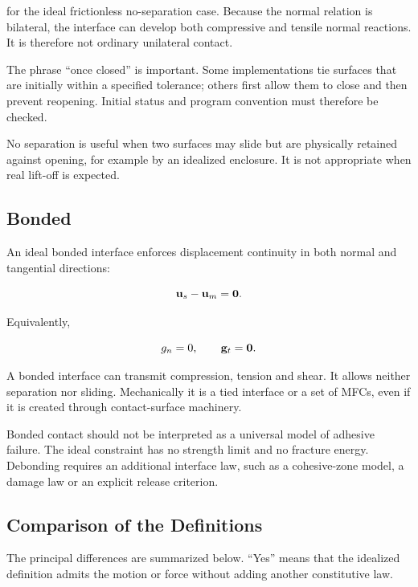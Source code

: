 for the ideal frictionless no-separation case. Because the normal relation is
bilateral, the interface can develop both compressive and tensile normal
reactions. It is therefore not ordinary unilateral contact.

The phrase ``once closed'' is important. Some implementations tie surfaces that
are initially within a specified tolerance; others first allow them to close
and then prevent reopening. Initial status and program convention must therefore
be checked.

No separation is useful when two surfaces may slide but are physically retained
against opening, for example by an idealized enclosure. It is not appropriate
when real lift-off is expected.

\subsection{Bonded}

An ideal bonded interface enforces displacement continuity in both normal and
tangential directions:

\begin{bbox}
    \begin{equation}\label{contact-bonded-definition}
        \mathbf{u}_s - \mathbf{u}_m = \mathbf{0}.
    \end{equation}
\end{bbox}

Equivalently,

\begin{equation}
    g_n=0, \qquad \mathbf{g}_t=\mathbf{0}.
\end{equation}

A bonded interface can transmit compression, tension and shear. It allows
neither separation nor sliding. Mechanically it is a tied interface or a set of
MFCs, even if it is created through contact-surface machinery.

Bonded contact should not be interpreted as a universal model of adhesive
failure. The ideal constraint has no strength limit and no fracture energy.
Debonding requires an additional interface law, such as a cohesive-zone model,
a damage law or an explicit release criterion.

\subsection{Comparison of the Definitions}

The principal differences are summarized below. ``Yes'' means that the idealized
definition admits the motion or force without adding another constitutive law.

